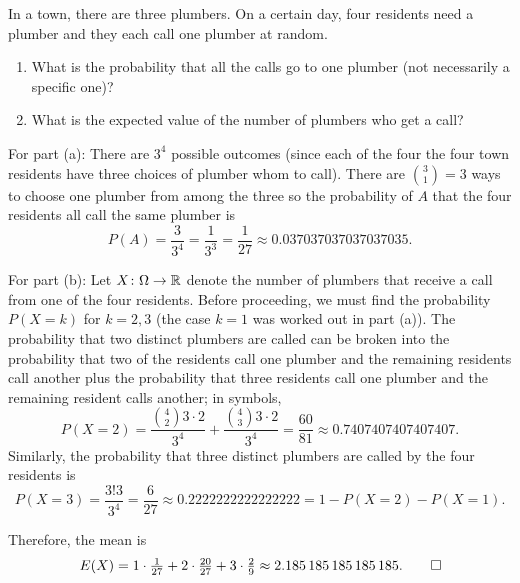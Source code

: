 \begin{problem}[Handout 3, \# 5]
  In a town, there are three plumbers. On a certain day, four residents
  need a plumber and they each call one plumber at random.
  \begin{enumerate}[label=(\alph*),noitemsep]
  \item What is the probability that all the calls go to one plumber (not
    necessarily a specific one)?
  \item What is the expected value of the number of plumbers who get a
    call?
  \end{enumerate}
\end{problem}
\begin{solution*}
  For part (a): There are \(3^4\) possible outcomes (since each of the four
  the four town residents have three choices of plumber whom to
  call). There are \(\binom{3}{1}=3\) ways to choose one plumber from among
  the three so the probability of \(A\) that the four residents all call
  the same plumber is
  \[
    P(A)=\frac{3}{3^4}=%
    \frac{1}{3^3}=%
    \frac{1}{27}\approx%
    \num{0.037037037037037035}.
  \]

  For part (b): Let \(X\colon\Omega\to\mathbb{R}\) denote the number of plumbers
  that receive a call from one of the four residents. Before proceeding, we
  must find the probability \(P(X=k)\) for \(k=2,3\) (the case \(k=1\) was
  worked out in part (a)). The probability that two distinct plumbers are
  called can be broken into the probability that two of the residents call
  one plumber and the remaining residents call another plus the probability
  that three residents call one plumber and the remaining resident calls
  another; in symbols,
  \[
    P(X=2)=%
    \frac{\binom{4}{2}3\cdot 2}{3^4}+\frac{\binom{4}{3}3\cdot 2}{3^4}=%
    \frac{60}{81}\approx\num{0.7407407407407407}.
  \]
  Similarly, the probability that three distinct plumbers are called by the
  four residents is
  \[
    P(X=3)=%
    \frac{3!3}{3^4}=\frac{6}{27}\approx%
    \num{0.2222222222222222}=%
    1-P(X=2)-P(X=1).
  \]

  Therefore, the mean is
  \[
    E(X)
    =1\cdot\tfrac{1}{27}+2\cdot\tfrac{20}{27}+3\cdot\tfrac{2}{9}
    \approx\num{2.185185185185185}.\qedhere
  \]
\end{solution*}

